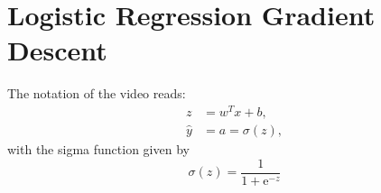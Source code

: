 \documentclass{article}
\newcommand{\of}[1]{\left( {#1} \right)}
\newcommand{\ee}{\text{e}}
\begin{document}
\section*{Logistic Regression Gradient Descent}
The notation of the video reads:
\[
\begin{split}
z & = w^T x + b,\\
\hat y &= a = \sigma\of{z},
\end{split}
\]
with the sigma function given by
\[
\sigma\of{z} = \frac{1}{1 + \ee^{-z}}
\]
\end{document}

